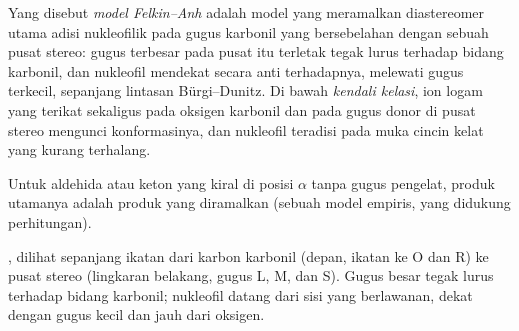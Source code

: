 \begin{definition}\label{def:b3:asymmetric-synthesis:felkin}
Yang disebut \emph{model Felkin--Anh} adalah model yang meramalkan
diastereomer utama adisi nukleofilik pada gugus karbonil yang bersebelahan dengan sebuah
pusat stereo: gugus terbesar pada pusat itu terletak tegak lurus terhadap bidang
karbonil, dan nukleofil mendekat secara anti terhadapnya, melewati gugus
terkecil, sepanjang lintasan Bürgi--Dunitz. Di bawah \emph{kendali
kelasi}, ion logam yang terikat sekaligus pada oksigen karbonil
dan pada gugus donor di pusat stereo mengunci konformasinya, dan
nukleofil teradisi pada muka cincin kelat yang kurang terhalang.
\end{definition}

\begin{proposition}\label{prop:b3:asymmetric-synthesis:felkin}
Untuk aldehida atau keton yang kiral di posisi $\alpha$ tanpa gugus pengelat, produk
utamanya adalah produk yang diramalkan  (sebuah model empiris,
yang didukung perhitungan). \admitted
\end{proposition}

\begin{omfigure}

{\small {}, dilihat sepanjang ikatan dari karbon karbonil (depan,
ikatan ke O dan R) ke pusat stereo (lingkaran belakang, gugus L, M, dan S). Gugus
besar tegak lurus terhadap bidang karbonil; nukleofil datang dari
sisi yang berlawanan, dekat dengan gugus kecil dan jauh dari oksigen.}
\end{omfigure}


